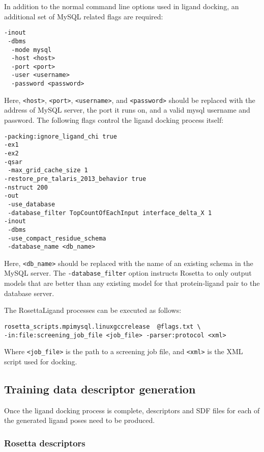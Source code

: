 In addition to the normal command line options used in ligand docking, an additional set of MySQL related flags are required:
\singlespace
\begin{verbatim}
-inout
 -dbms
  -mode mysql
  -host <host>
  -port <port>
  -user <username>
  -password <password>
\end{verbatim}
\doublespace
Here, \texttt{<host>}, \texttt{<port>}, \texttt{<username>}, and \texttt{<password>} should be replaced with the address of MySQL server, the port it runs on, and a valid mysql username and password. 
The following flags control the ligand docking process itself:
\singlespace
\begin{verbatim}
-packing:ignore_ligand_chi true
-ex1
-ex2
-qsar
 -max_grid_cache_size 1
-restore_pre_talaris_2013_behavior true
-nstruct 200
-out
 -use_database
 -database_filter TopCountOfEachInput interface_delta_X 1
-inout
 -dbms
 -use_compact_residue_schema
 -database_name <db_name>
\end{verbatim}
\doublespace
Here, \texttt{<db\_name>} should be replaced with the name of an existing schema in the MySQL server.
The \texttt{-database\_filter} option instructs Rosetta to only output models that are better than any existing model for that protein-ligand pair to the database server. 

The RosettaLigand processes can be executed as follows:
\singlespace
\begin{verbatim}
rosetta_scripts.mpimysql.linuxgccrelease  @flags.txt \
-in:file:screening_job_file <job_file> -parser:protocol <xml>
\end{verbatim}
\doublespace
Where \texttt{<job\_file>} is the path to a screening job file, and \texttt{<xml>} is the \ac{XML} script used for docking.

\subsection{Training data descriptor generation}

Once the ligand docking process is complete, descriptors and \ac{SDF} files for each of the generated ligand poses need to be produced.

\subsubsection{Rosetta descriptors}

